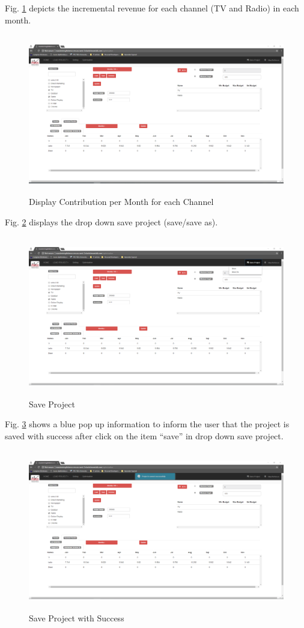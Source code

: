 Fig. \ref{DCMCscreentshots} depicts the incremental revenue for each channel (TV and Radio) in each month.
\begin{figure}[!h]
	\centering
	\includegraphics[width=17cm,height=7cm]{9.png}
	\caption{Display Contribution per Month for each Channel}
	\label{DCMCscreentshots}	
\end{figure} 
\clearpage
\newpage 
Fig. \ref{SPscreentshots} displays the drop down save project (save/save as).
\begin{figure}[!h]
	\centering
	\includegraphics[width=17cm,height=7cm]{10.png}
	\caption{Save Project}
	\label{SPscreentshots}	
\end{figure}

Fig. \ref{SPWSscreentshots} shows  a blue pop up information to inform the user that the project is saved with success after click on the item ``save'' in drop down save project.
\begin{figure}[!h]
	\centering
	\includegraphics[width=17cm,height=7cm]{11.png}
	\caption{Save Project with Success}
	\label{SPWSscreentshots}		
\end{figure} 
\clearpage
\newpage 

